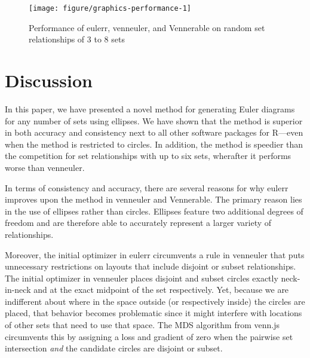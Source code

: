 \documentclass[
  oneside,
  openany,
  numbers=noendperiod,
  parskip=half,
  bibliography=totoc
]{scrbook}\usepackage[]{graphicx}\usepackage{xcolor}
\newenvironment{knitrout}{}{} %
\newcommand{\pkg}[1]{{\fontseries{b}\selectfont #1}}
\begin{document}
\begin{figure}[hbt]
\begin{knitrout}\small
{}\color{fgcolor}

{\centering \texttt{[image: figure/graphics-performance-1]} 

}



\end{knitrout}
\caption{Performance of \pkg{eulerr}, \pkg{venneuler}, and \pkg{Vennerable} on
random set relationships of 3 to 8 sets }
\label{fig:performance}
\end{figure}

\chapter{Discussion}
\label{sec:discussion}

In this paper, we have presented a novel method for generating Euler diagrams
for any number of sets using ellipses. We have shown that the method is superior
in both accuracy and consistency next to all other software packages for
R---even when the method is restricted to circles. In addition, the method is
speedier than the competition for set relationships with up to six sets,
wherafter it performs worse than \pkg{venneuler}.

In terms of consistency and accuracy, there are several reasons for why
\pkg{eulerr} improves upon the method in \pkg{venneuler} and \pkg{Vennerable}.
The primary reason lies in the use of ellipses rather than circles. Ellipses
feature two additional degrees of freedom and are therefore able to accurately
represent a larger variety of relationships.

Moreover, the initial optimizer in \pkg{eulerr} circumvents a rule in
\pkg{venneuler} that puts unnecessary restrictions on layouts that include
disjoint or subset relationships. The initial optimizer in venneuler places
disjoint and subset circles exactly neck-in-neck and at the exact midpoint of
the set respectively. Yet, because we are indifferent about where in the space
outside (or respectively inside) the circles are placed, that behavior becomes
problematic since it might interfere with locations of other sets that need to
use that space. The MDS algorithm from \pkg{venn.js} circumvents this by
assigning a loss and gradient of zero when the pairwise set intersection
\emph{and} the candidate circles are disjoint or subset.
\end{document}

